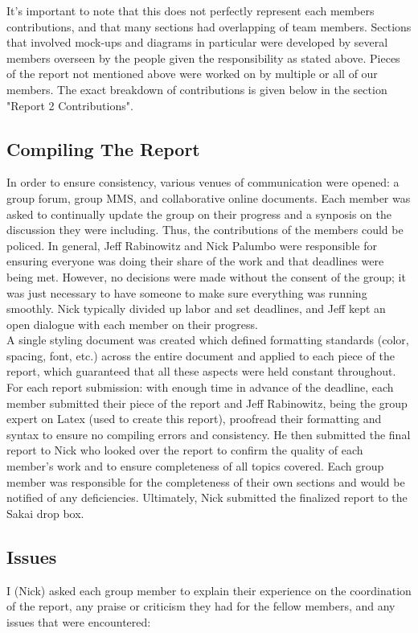 It's important to note that this does not perfectly represent each members contributions, and that many sections had overlapping of team members. Sections that involved mock-ups and diagrams in particular were developed by several members overseen by the people given the responsibility as stated above. Pieces of the report not mentioned above were worked on by multiple or all of our members. The exact breakdown of contributions is given below in the section "Report 2 Contributions". \\

\subsection{Compiling The Report}
In order to ensure consistency, various venues of communication were opened: a group forum, group MMS, and collaborative online documents. Each member was asked to continually update the group on their progress and a synposis on the discussion they were including. Thus, the contributions of the members could be policed. In general, Jeff Rabinowitz and Nick Palumbo were responsible for ensuring everyone was doing their share of the work and that deadlines were being met. However, no decisions were made without the consent of the group; it was just necessary to have someone to make sure everything was running smoothly. Nick typically divided up labor and set deadlines, and Jeff kept an open dialogue with each member on their progress. \\

A single styling document was created which defined formatting standards (color, spacing, font, etc.) across the entire document and applied to each piece of the report, which guaranteed that all these aspects were held constant throughout. For each report submission: with enough time in advance of the deadline, each member submitted their piece of the report and Jeff Rabinowitz, being the group expert on Latex (used to create this report), proofread their formatting and syntax to ensure no compiling errors and consistency. He then submitted the final report to Nick who looked over the report to confirm the quality of each member's work and to ensure completeness of all topics covered. Each group member was responsible for the completeness of their own sections and would be notified of any deficiencies. Ultimately, Nick submitted the finalized report to the Sakai drop box. \\

\subsection{Issues}
 I (Nick) asked each group member to explain their experience on the coordination of the report, any praise or criticism they had for the fellow members, and any issues that were encountered:

